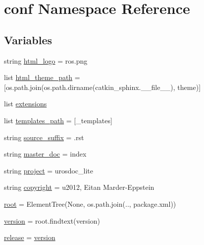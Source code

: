 \hypertarget{namespaceconf}{}\section{conf Namespace Reference}
\label{namespaceconf}
\subsection*{Variables}
\begin{DoxyCompactItemize}
\item 
string \hyperlink{namespaceconf_a85ebd472b7d3a9e41a63030cdd5944e6}{html\+\_\+logo} = \textquotesingle{}ros.\+png\textquotesingle{}
\item 
list \hyperlink{namespaceconf_a4960231f83b1b44a1ffcd212903b62e8}{html\+\_\+theme\+\_\+path} = \mbox{[}os.\+path.\+join(os.\+path.\+dirname(catkin\+\_\+sphinx.\+\_\+\+\_\+file\+\_\+\+\_\+), \textquotesingle{}theme\textquotesingle{})\mbox{]}
\item 
list \hyperlink{namespaceconf_ae475e080536acb271a0a0efe56c3ba42}{extensions}
\item 
list \hyperlink{namespaceconf_ae850ae634911b713e036b43894fdd525}{templates\+\_\+path} = \mbox{[}\textquotesingle{}\+\_\+templates\textquotesingle{}\mbox{]}
\item 
string \hyperlink{namespaceconf_a10af2a769eb3bd3322e874f677e435b1}{source\+\_\+suffix} = \textquotesingle{}.rst\textquotesingle{}
\item 
string \hyperlink{namespaceconf_a6fcd7e5236f355b1e1a55f9d95988810}{master\+\_\+doc} = \textquotesingle{}index\textquotesingle{}
\item 
string \hyperlink{namespaceconf_a45653c983098153b78e33600e39230eb}{project} = u\textquotesingle{}rosdoc\+\_\+lite\textquotesingle{}
\item 
string \hyperlink{namespaceconf_a33fa97cf51dcb25970fbf53f10159589}{copyright} = u\textquotesingle{}2012, Eitan Marder-\/Eppstein\textquotesingle{}
\item 
\hyperlink{namespaceconf_ad32f00e5793a88cf41ae2357bd582ca0}{root} = Element\+Tree(None, os.\+path.\+join(\textquotesingle{}..\textquotesingle{}, \textquotesingle{}package.\+xml\textquotesingle{}))
\item 
\hyperlink{namespaceconf_af51f21968ea73bb4391b0d4aed1f7ad2}{version} = root.\+findtext(\textquotesingle{}version\textquotesingle{})
\item 
\hyperlink{namespaceconf_aee93453546a31f4e76999ebaadf6e356}{release} = \hyperlink{namespaceconf_af51f21968ea73bb4391b0d4aed1f7ad2}{version}

\end{DoxyCompactItemize}
